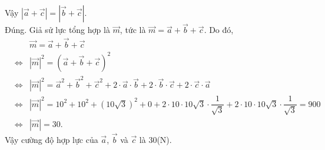 \begin{ex}
{\begin{itemchoice}
			Vậy $\left| \overrightarrow{a} + \overrightarrow{c} \right| = \left| \overrightarrow{b} + \overrightarrow{c} \right|$. \\
			\itemch Đúng. Giả sử lực tổng hợp là $\overrightarrow{m}$, tức là
			 $\overrightarrow{m} = \overrightarrow{a} + \overrightarrow{b} + \overrightarrow{c}$. Do đó,
			\begin{eqnarray*}
				& &\overrightarrow{m} = \overrightarrow{a} +\overrightarrow{b} +\overrightarrow{c}\\ 
				& \Leftrightarrow & \left| \overrightarrow{m} \right|^2 =\left( \overrightarrow{a} +\overrightarrow{b} +\overrightarrow{c} \right)^2 \\
				& \Leftrightarrow & \left| \overrightarrow{m} \right|^2 =\overrightarrow{a}^2 +\overrightarrow{b}^2 +\overrightarrow{c}^2 +2 \cdot \overrightarrow{a} \cdot \overrightarrow{b} +2 \cdot \overrightarrow{b} \cdot \overrightarrow{c} +2 \cdot \overrightarrow{c} \cdot \overrightarrow{a}\\
				& \Leftrightarrow & \left| \overrightarrow{m} \right|^2 = 10^2 +10^2 + \left( 10\sqrt{3} \right)^2 +0 + 2 \cdot 10 \cdot 10\sqrt{3} \cdot \dfrac{1}{\sqrt{3}} +2 \cdot 10 \cdot 10\sqrt{3} \cdot \dfrac{1}{\sqrt{3}}=900 \\
				&\Leftrightarrow & \left| \overrightarrow{m} \right|=30.
			\end{eqnarray*}
			Vậy cường độ hợp lực của $\overrightarrow{a}$, $\overrightarrow{b}$ và $\overrightarrow{c}$ là $30$(N).
		\end{itemchoice}
	}
\end{ex}

